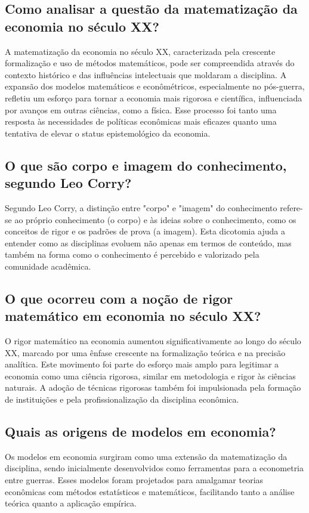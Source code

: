 \documentclass[a4paper,12pt]{article}[abntex2]
\begin{document}
\subsection{\textbf{Como analisar a questão da matematização da economia no século XX?}}
A matematização da economia no século XX, caracterizada pela crescente formalização e uso de métodos matemáticos, pode ser compreendida através do contexto histórico e das influências intelectuais que moldaram a disciplina. A expansão dos modelos matemáticos e econômétricos, especialmente no pós-guerra, refletiu um esforço para tornar a economia mais rigorosa e científica, influenciada por avanços em outras ciências, como a física. Esse processo foi tanto uma resposta às necessidades de políticas econômicas mais eficazes quanto uma tentativa de elevar o status epistemológico da economia.

\subsection{\textbf{O que são corpo e imagem do conhecimento, segundo Leo Corry?}}
Segundo Leo Corry, a distinção entre "corpo" e "imagem" do conhecimento refere-se ao próprio conhecimento (o corpo) e às ideias sobre o conhecimento, como os conceitos de rigor e os padrões de prova (a imagem). Esta dicotomia ajuda a entender como as disciplinas evoluem não apenas em termos de conteúdo, mas também na forma como o conhecimento é percebido e valorizado pela comunidade acadêmica.

\subsection{\textbf{O que ocorreu com a noção de rigor matemático em economia no século XX?}}
O rigor matemático na economia aumentou significativamente ao longo do século XX, marcado por uma ênfase crescente na formalização teórica e na precisão analítica. Este movimento foi parte do esforço mais amplo para legitimar a economia como uma ciência rigorosa, similar em metodologia e rigor às ciências naturais. A adoção de técnicas rigorosas também foi impulsionada pela formação de instituições e pela profissionalização da disciplina econômica.

\subsection{\textbf{Quais as origens de modelos em economia?}}
Os modelos em economia surgiram como uma extensão da matematização da disciplina, sendo inicialmente desenvolvidos como ferramentas para a econometria entre guerras. Esses modelos foram projetados para amalgamar teorias econômicas com métodos estatísticos e matemáticos, facilitando tanto a análise teórica quanto a aplicação empírica.
\end{document}
